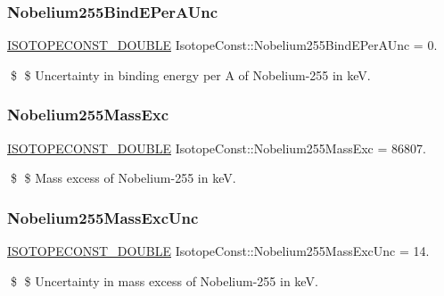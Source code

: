 \subsubsection{\texorpdfstring{Nobelium255\+Bind\+E\+Per\+A\+Unc}{Nobelium255BindEPerAUnc}}
{\footnotesize\ttfamily \mbox{\hyperlink{group___isotope_const-_macros_ga8f45a7272ce02c0b4c65c44636ed719a}{I\+S\+O\+T\+O\+P\+E\+C\+O\+N\+S\+T\+\_\+\+D\+O\+U\+B\+LE}} Isotope\+Const\+::\+Nobelium255\+Bind\+E\+Per\+A\+Unc = 0.}

\$ \$ Uncertainty in binding energy per A of Nobelium-\/255 in keV. \mbox{\label{group___isotope_const-_nobelium-_no255_gadf03b0ec0594ba320b411582ab9a04a8}} 
\subsubsection{\texorpdfstring{Nobelium255\+Mass\+Exc}{Nobelium255MassExc}}
{\footnotesize\ttfamily \mbox{\hyperlink{group___isotope_const-_macros_ga8f45a7272ce02c0b4c65c44636ed719a}{I\+S\+O\+T\+O\+P\+E\+C\+O\+N\+S\+T\+\_\+\+D\+O\+U\+B\+LE}} Isotope\+Const\+::\+Nobelium255\+Mass\+Exc = 86807.}

\$ \$ Mass excess of Nobelium-\/255 in keV. \mbox{\label{group___isotope_const-_nobelium-_no255_gab05833f671e28e3e7f5b72bb71414aab}} 
\subsubsection{\texorpdfstring{Nobelium255\+Mass\+Exc\+Unc}{Nobelium255MassExcUnc}}
{\footnotesize\ttfamily \mbox{\hyperlink{group___isotope_const-_macros_ga8f45a7272ce02c0b4c65c44636ed719a}{I\+S\+O\+T\+O\+P\+E\+C\+O\+N\+S\+T\+\_\+\+D\+O\+U\+B\+LE}} Isotope\+Const\+::\+Nobelium255\+Mass\+Exc\+Unc = 14.}

\$ \$ Uncertainty in mass excess of Nobelium-\/255 in keV. \mbox{\label{group___isotope_const-_nobelium-_no255_ga22f9ebcfe1d114261315a94a97009fe1}} 
